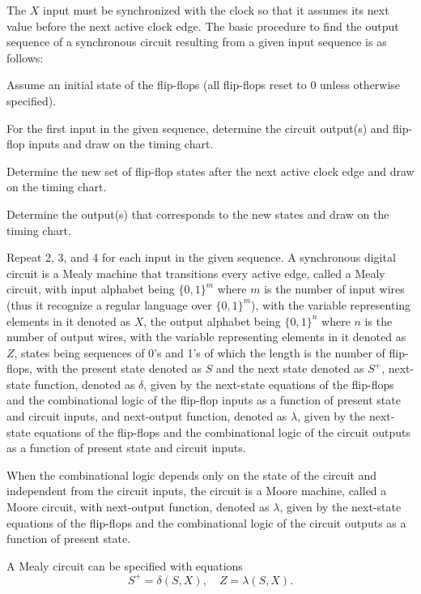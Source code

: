 \documentclass[a4paper,12pt]{report}
\begin{document}
The $X$ input must be synchronized with the clock so that it assumes its next value before the next active clock edge.
The basic procedure to find the output sequence of a synchronous circuit resulting from a given input sequence is as follows:
\ben
\item Assume an initial state of the flip-flops (all flip-flops reset to 0 unless otherwise specified).
\item For the first input in the given sequence, determine the circuit output(s) and flip-flop inputs and draw on the timing chart.
\item Determine the new set of flip-flop states after the next active clock edge and draw on the timing chart.
\item Determine the output(s) that corresponds to the new states and draw on the timing chart.
\item Repeat 2, 3, and 4 for each input in the given sequence.
\een
{}
A synchronous digital circuit is a Mealy machine that transitions every active edge, called a Mealy circuit, with input alphabet being $\{0,1\}^m$ where $m$ is the number of input wires (thus it recognize a regular language over $\{0,1\}^m$), with the variable representing elements in it denoted as $X$, the output alphabet being $\{0,1\}^n$ where $n$ is the number of output wires, with the variable representing elements in it denoted as $Z$, states being sequences of 0's and 1's of which the length is the number of flip-flops, with the present state denoted as $S$ and the next state denoted as $S^+$, next-state function, denoted as $\delta$, given by the next-state equations of the flip-flops and the combinational logic of the flip-flop inputs as a function of present state and circuit inputs, and next-output function, denoted as $\lambda$, given by the next-state equations of the flip-flops and the combinational logic of the circuit outputs as a function of present state and circuit inputs.

When the combinational logic depends only on the state of the circuit and independent from the circuit inputs, the circuit is a Moore machine, called a Moore circuit, with next-output function, denoted as $\lambda$, given by the next-state equations of the flip-flops and the combinational logic of the circuit outputs as a function of present state.

A Mealy circuit can be specified with equations
\[S^+=\delta(S,X),\quad Z=\lambda(S,X).\]
\end{document}
